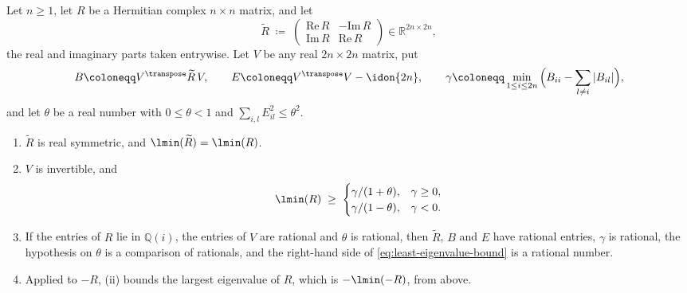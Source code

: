 \begin{lemma}\label{lem:least-eigenvalue-bound}
Let $n\ge1$, let $R$ be a Hermitian complex $n\times n$ matrix, and let
\begin{equation}\label{eq:real-embedding}
  \widetilde R\;\coloneqq\;
  \begin{pmatrix}\mathrm{Re}\,R&-\mathrm{Im}\,R\\
  \mathrm{Im}\,R&\mathrm{Re}\,R\end{pmatrix}\in\mathbb{R}^{2n\times2n},
\end{equation}
the real and imaginary parts taken entrywise. Let $V$ be any real
$2n\times2n$ matrix, put
\begin{equation*}
  B\coloneqq V^{\transpose}\widetilde R\,V,\qquad
  E\coloneqq V^{\transpose}V-\idon{2n},\qquad
  \gamma\coloneqq\min_{1\le i\le2n}\Big(B_{ii}-\sum_{l\ne i}|B_{il}|\Big),
\end{equation*}
and let $\theta$ be a real number with $0\le\theta<1$ and
$\sum_{i,l}E_{il}^{2}\le\theta^{2}$.
\begin{enumerate}[label=(\roman*),leftmargin=2.4em]
\item $\widetilde R$ is real symmetric, and $\lmin(\widetilde R)=\lmin(R)$.
\item $V$ is invertible, and
\begin{equation}\label{eq:least-eigenvalue-bound}
  \lmin(R)\;\ge\;
  \begin{cases}
    \gamma/(1+\theta), & \gamma\ge0,\\
    \gamma/(1-\theta), & \gamma<0.
  \end{cases}
\end{equation}
\item If the entries of $R$ lie in $\mathbb{Q}(i)$, the entries of $V$ are
  rational and $\theta$ is rational, then $\widetilde R$, $B$ and $E$ have
  rational entries, $\gamma$ is rational, the hypothesis on $\theta$ is a
  comparison of rationals, and the right-hand side of
  \eqref{eq:least-eigenvalue-bound} is a rational number.
\item Applied to $-R$, (ii) bounds the largest eigenvalue of $R$, which is
  $-\lmin(-R)$, from above.
\end{enumerate}
\end{lemma}

